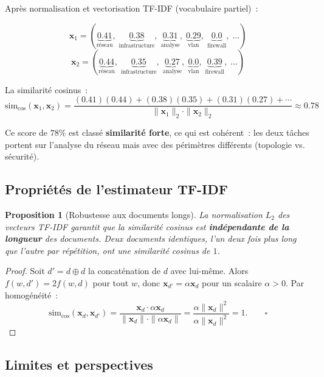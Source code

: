 \documentclass[12pt, a4paper]{article}
\newtheorem{proposition}{Proposition}[section]
\begin{document}
Après normalisation et vectorisation TF-IDF (vocabulaire partiel)~:

\[
\mathbf{x}_1 = (\underbrace{0.41}_{\text{réseau}},\; \underbrace{0.38}_{\text{infrastructure}},\; \underbrace{0.31}_{\text{analyse}},\; \underbrace{0.29}_{\text{vlan}},\; \underbrace{0.0}_{\text{firewall}},\; \ldots)
\]
\[
\mathbf{x}_2 = (\underbrace{0.44}_{\text{réseau}},\; \underbrace{0.35}_{\text{infrastructure}},\; \underbrace{0.27}_{\text{analyse}},\; \underbrace{0.0}_{\text{vlan}},\; \underbrace{0.39}_{\text{firewall}},\; \ldots)
\]

La similarité cosinus~:
\[
\mathrm{sim}_{\cos}(\mathbf{x}_1, \mathbf{x}_2)
= \frac{(0.41)(0.44) + (0.38)(0.35) + (0.31)(0.27) + \cdots}{\|\mathbf{x}_1\|_2 \cdot \|\mathbf{x}_2\|_2}
\approx \mathbf{0.78}
\]

Ce score de $78\%$ est classé \textbf{similarité forte}, ce qui est cohérent~: les deux tâches portent sur l'analyse du réseau mais avec des périmètres différents (topologie vs. sécurité).

\subsection{Propriétés de l'estimateur TF-IDF}

\begin{proposition}[Robustesse aux documents longs]
La normalisation $L_2$ des vecteurs TF-IDF garantit que la similarité cosinus est \textbf{indépendante de la longueur} des documents. Deux documents identiques, l'un deux fois plus long que l'autre par répétition, ont une similarité cosinus de $1$.
\end{proposition}

\begin{proof}
Soit $d' = d \oplus d$ la concaténation de $d$ avec lui-même. Alors $f(w, d') = 2f(w, d)$ pour tout $w$, donc $\mathbf{x}_{d'} = \alpha \mathbf{x}_d$ pour un scalaire $\alpha > 0$. Par homogénéité~:
\[
\mathrm{sim}_{\cos}(\mathbf{x}_d, \mathbf{x}_{d'})
= \frac{\mathbf{x}_d \cdot \alpha\mathbf{x}_d}{\|\mathbf{x}_d\| \cdot \|\alpha\mathbf{x}_d\|}
= \frac{\alpha \|\mathbf{x}_d\|^2}{\alpha \|\mathbf{x}_d\|^2} = 1. \qquad \square
\]
\end{proof}

\subsection{Limites et perspectives}
\end{document}
